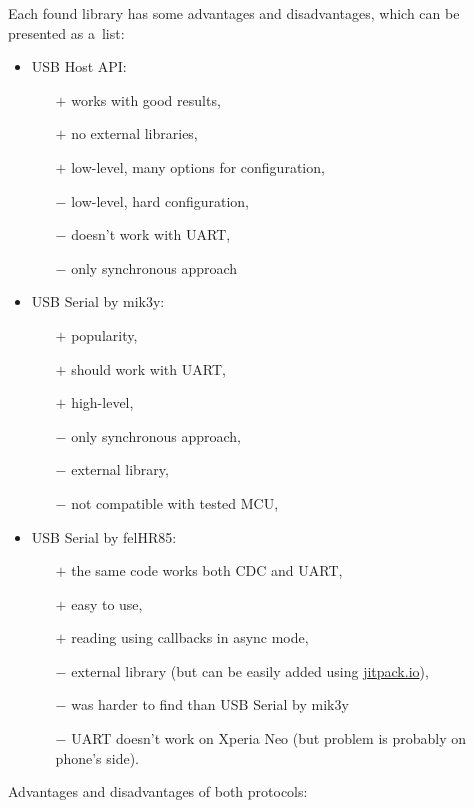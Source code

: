 Each found library has some advantages and disadvantages, which can be presented
as a~list:
\begin{itemize}
  \item USB Host API:
  	\begin{itemize}
  	  \item[$+$] works with good results,
  	  \item[$+$] no external libraries,
  	  \item[$+$] low-level, many options for configuration,
  	  \item[$-$] low-level, hard configuration,
  	  \item[$-$] doesn't work with UART,
  	  \item[$-$] only synchronous approach
  	\end{itemize}
  \item USB Serial by mik3y:
	\begin{itemize}
  	  \item[$+$] popularity,
  	  \item[$+$] should work with UART,
  	  \item[$+$] high-level,
  	  \item[$-$] only synchronous approach,
  	  \item[$-$] external library,
  	  \item[$-$] not compatible with tested MCU,
  	\end{itemize}
  \item USB Serial by felHR85:
	\begin{itemize}
	  \item[$+$] the same code works both CDC and UART,
	  \item[$+$] easy to use,
	  \item[$+$] reading using callbacks in async mode,
  	  \item[$-$] external library (but can be easily added using
  	  	\url{jitpack.io}),
  	  \item[$-$] was harder to find than USB Serial by mik3y
  	  \item[$-$] UART doesn't work on Xperia Neo (but problem is probably on
  	  	phone's side).
  	\end{itemize}
\end{itemize}
Advantages and disadvantages of both protocols:
